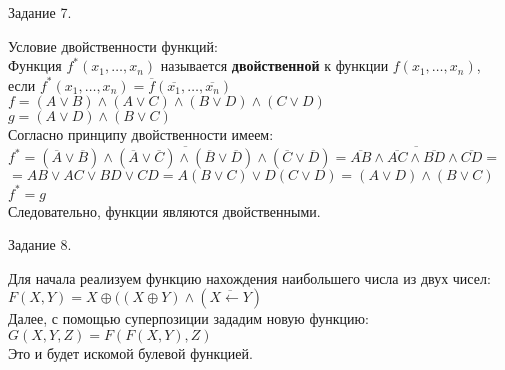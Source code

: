 \documentclass[a4paper,12pt]{report} %
\begin{document}
\bigskip

\begin{center}
	Задание 7.\\
\end{center}

\begin{flushleft}
	Условие двойственности функций:\\
	Функция $f^{*}(x_1, \ldots , x_n)$ называется \textbf{двойственной} к функции $f(x_1, \ldots , x_n)$,\\
	если $f^{*}(x_1, \ldots , x_n) = \overline{f}(\overline{x_1}, \ldots , \overline{x_n})$\\
	\bigskip
	$f=(A \vee B) \wedge (A \vee C) \wedge (B \vee D) \wedge (C \vee D)$\\
	$g= (A \vee D) \wedge (B \vee C)$\\
	Согласно принципу двойственности имеем:\\
	$f^{*} = \overline{(\overline{A} \vee \overline{B}) \wedge (\overline{A} \vee \overline{C}) \wedge 
	(\overline{B} \vee \overline{D}) \wedge (\overline{C} \vee \overline{D})} = 
	\overline{\overline{AB} \wedge \overline{AC} \wedge \overline{BD} \wedge \overline{CD}} =$\\
	$ = AB \vee AC \vee BD \vee CD = A(B \vee C) \vee D(C \vee D) = (A \vee D) \wedge (B \vee C)$\\
	$f^{*} = g$\\
	Следовательно, функции являются двойственными.
\end{flushleft}

\bigskip

\begin{center}
	Задание 8.\\
\end{center}

\begin{flushleft}
	Для начала реализуем функцию нахождения наибольшего числа из двух чисел:\\
	$F(X,Y)=X \oplus ((X \oplus Y) \wedge (\overline{X \leftarrow Y}) $\\
	Далее, с помощью суперпозиции зададим новую функцию:\\
	$G(X,Y,Z) = F(F(X,Y),Z)$\\
	Это и будет искомой булевой функцией.
	
\end{flushleft}
\end{document}
